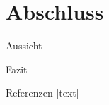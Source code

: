 \documentclass{beamer}
\begin{document}
\section{Abschluss}

\begin{frame}{Aussicht}
	
\end{frame}

\begin{frame}{Fazit}
	
\end{frame}

\begin{frame}[allowframebreaks]{Referenzen}
	[text]
	
	
\end{frame}
\end{document}
